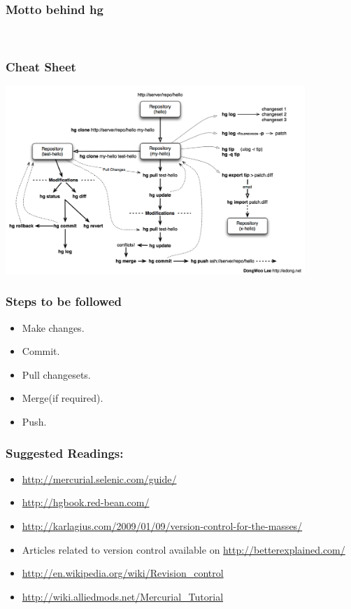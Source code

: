 \documentclass[14pt,compress]{beamer}
\newcounter{time}
\newcommand{\inctime}[1]{\addtocounter{time}{#1}{\tiny \thetime\ m}}
\begin{document}
\begin{frame}
  \frametitle{Motto behind hg}
  \begin{center}
  \color{red}{``Commit Early Commit Often.''}\\  
  \end{center}  
\end{frame}

\begin{frame}
  \frametitle{Cheat Sheet}
  \begin{center}
  \includegraphics[height=2.8in]{mod}  
  \end{center}  
\end{frame}

\begin{frame}
  \frametitle{Steps to be followed}
  \begin{itemize}
  \item Make changes.
  \item Commit.
  \item Pull changesets.
  \item Merge(if required).
  \item Push.
  \end{itemize}
  \inctime{10}
\end{frame}

\begin{frame}
  \frametitle{Suggested Readings:}
  \begin{itemize}
  \item \url{http://mercurial.selenic.com/guide/}
  \item \url{http://hgbook.red-bean.com/}    
  \item \url{http://karlagius.com/2009/01/09/version-control-for-the-masses/}
  \item Articles related to version control available on \url{http://betterexplained.com/}
  \item \url{http://en.wikipedia.org/wiki/Revision_control}
  \item \url{http://wiki.alliedmods.net/Mercurial_Tutorial}
  \end{itemize}
\end{frame}
\end{document}
